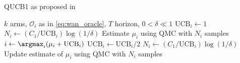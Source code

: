 \begin{algorithm}
    \caption{QUCB1 as proposed in \cite{wan2022}}
    \label{alg:qucb1}
    \begin{algorithmic}[1]
        \Require $k$ arms, $\mathcal{O}_i$ as in \cref{eq:wan_oracle}, $T$ horizon, $0 < \delta \ll 1$
        \State $\text{UCB}_i \gets 1$
        \State $N_i \gets (C_1/\text{UCB}_i) \log(1/\delta)$
        \State Estimate $\mu_i$ using QMC with $N_i$ samples
        \EndFor
        \State $i \gets \argmax_i (\mu_i + \text{UCB}_i)$
        \State $\text{UCB}_i \gets \text{UCB}_i /2$
        \State $N_i \gets (C_1/\text{UCB}_i) \log(1/\delta)$
        \State Update estimate of $\mu_i$ using QMC with $N_i$ samples
        \EndWhile
    \end{algorithmic}
\end{algorithm}
